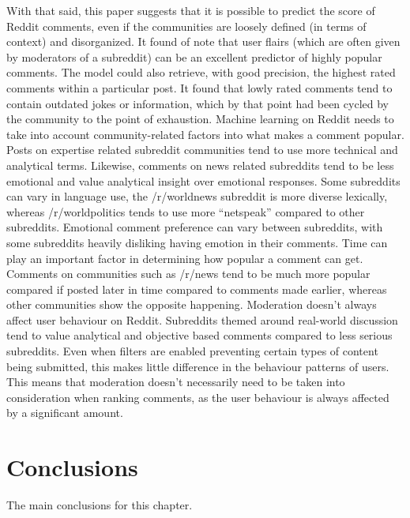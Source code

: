 With that said, this paper \cite{9} suggests that it is possible to predict the score of Reddit comments, even if the communities are loosely defined (in terms of context) and disorganized. It found of note that user flairs (which are often given by moderators of a subreddit) can be an excellent predictor of highly popular comments. The model could also retrieve, with good precision, the highest rated comments within a particular post. It found that lowly rated comments tend to contain outdated jokes or information, which by that point had been cycled by the community to the point of exhaustion. Machine learning on Reddit needs to take into account community-related factors into what makes a comment popular. Posts on expertise related subreddit communities tend to use more technical and analytical terms. Likewise, comments on news related subreddits tend to be less emotional and value analytical insight over emotional responses. Some subreddits can vary in language use, the /r/worldnews subreddit is more diverse lexically, whereas /r/worldpolitics tends to use more “netspeak” compared to other subreddits. Emotional comment preference can vary between subreddits, with some subreddits heavily disliking having emotion in their comments. Time can play an important factor in determining how popular a comment can get. Comments on communities such as /r/news tend to be much more popular compared if posted later in time compared to comments made earlier, whereas other communities show the opposite happening. Moderation doesn’t always affect user behaviour on Reddit. Subreddits themed around real-world discussion tend to value analytical and objective based comments compared to less serious subreddits. Even when filters are enabled preventing certain types of content being submitted, this makes little difference in the behaviour patterns of users. This means that moderation doesn’t necessarily need to be taken into consideration when ranking comments, as the user behaviour is always affected by a significant amount.


\section{Conclusions}

The main conclusions for this chapter.
